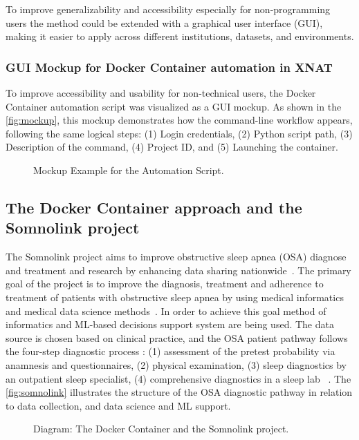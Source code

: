 To improve generalizability and accessibility especially for non-programming users the method could be extended with a graphical user interface (GUI), making it easier to apply across different institutions, datasets, and environments. 
\normalsize
\subsubsection{GUI Mockup for Docker Container automation in XNAT}
\normalsize
To improve accessibility and usability for non-technical users, the Docker Container  automation script was visualized as a GUI mockup. As shown in the \autoref{fig:mockup}, this mockup demonstrates how the command-line workflow appears, following the same logical steps: (1) Login credentials, (2) Python script path, (3) Description of the command, (4) Project ID, and (5) Launching the container.
\normalsize
\begin{figure}[H]
    \centering
    \def\svgwidth{\linewidth} 
    
    \caption{ Mockup Example for the Automation Script.}
    \label{fig:mockup}
\end{figure}
\normalsize
\subsection{The Docker Container approach and the Somnolink project}

The Somnolink project aims to improve obstructive sleep apnea (OSA) diagnose and  treatment and research by enhancing data sharing nationwide~\cite{krefting_somnolink_2025}. The primary goal of the project is to improve the diagnosis, treatment and adherence to treatment of patients with obstructive sleep apnea by using medical informatics and medical data science methods~\cite{aimsomnilink}.
In order to achieve this goal method of informatics and ML-based decisions support system are being used. 
The data source is chosen based on clinical practice, and the OSA patient pathway follows the four-step diagnostic process : (1) assessment of the pretest probability via anamnesis and questionnaires, (2) physical examination, (3) sleep diagnostics by an outpatient sleep specialist, (4) comprehensive diagnostics in a sleep lab ~\cite{krefting_somnolink_2025}.
The \autoref{fig:somnolink} illustrates the structure of the OSA diagnostic pathway in relation to data collection, and data science and ML support.
\begin{figure}[H]
    \centering
    \def\svgwidth{\linewidth} 
    
    \caption{Diagram: The Docker Container and the Somnolink project.}
    \label{fig:somnolink}
\end{figure}

